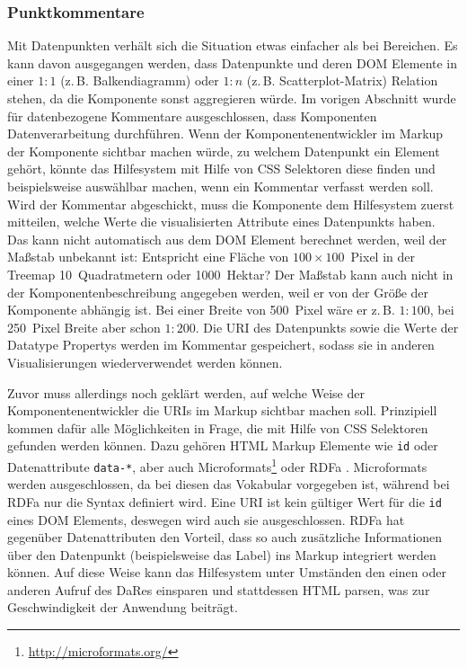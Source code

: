 \documentclass[
	headsepline,
	footsepline,
	fontsize=12pt,
	bibliography=totoc
]{scrbook}
\begin{document}
\subsubsection{Punktkommentare}


Mit Datenpunkten verhält sich die Situation etwas einfacher als bei Bereichen. Es kann davon ausgegangen werden, dass Datenpunkte und deren DOM Elemente in einer $1:1$ (z.\,B. Balkendiagramm) oder $1:n$ (z.\,B. Scatterplot-Matrix) Relation stehen, da die Komponente sonst aggregieren würde. Im vorigen Abschnitt wurde für datenbezogene Kommentare ausgeschlossen, dass Komponenten Datenverarbeitung durchführen. Wenn der Komponentenentwickler im Markup der Komponente sichtbar machen würde, zu welchem Datenpunkt ein Element gehört, könnte das Hilfesystem mit Hilfe von CSS Selektoren diese finden und beispielsweise auswählbar machen, wenn ein Kommentar verfasst werden soll. Wird der Kommentar abgeschickt, muss die Komponente dem Hilfesystem zuerst mitteilen, welche Werte die visualisierten Attribute eines Datenpunkts haben. Das kann nicht automatisch aus dem DOM Element berechnet werden, weil der Maßstab unbekannt ist: Entspricht eine Fläche von $100\times100$~Pixel in der Treemap 10~Quadratmetern oder 1000~Hektar? Der Maßstab kann auch nicht in der Komponentenbeschreibung angegeben werden, weil er von der Größe der Komponente abhängig ist. Bei einer Breite von 500~Pixel wäre er z.\,B. $1:100$, bei 250~Pixel Breite aber schon $1:200$. Die URI des Datenpunkts sowie die Werte der Datatype Propertys werden im Kommentar gespeichert, sodass sie in anderen Visualisierungen wiederverwendet werden können.


Zuvor muss allerdings noch geklärt werden, auf welche Weise der Komponentenentwickler die URIs im Markup sichtbar machen soll. Prinzipiell kommen dafür alle Möglichkeiten in Frage, die mit Hilfe von CSS Selektoren gefunden werden können. Dazu gehören HTML Markup Elemente wie \texttt{id} oder Datenattribute \texttt{data-*}, aber auch Microformats\footnote{\url{http://microformats.org/}} oder RDFa \cite{W3C2012}. Microformats werden ausgeschlossen, da bei diesen das Vokabular vorgegeben ist, während bei RDFa nur die Syntax definiert wird. Eine URI ist kein gültiger Wert für die \texttt{id} eines DOM Elements, deswegen wird auch sie ausgeschlossen. RDFa hat gegenüber Datenattributen den Vorteil, dass so auch zusätzliche Informationen über den Datenpunkt (beispielsweise das Label) ins Markup integriert werden können. Auf diese Weise kann das Hilfesystem unter Umständen den einen oder anderen Aufruf des DaRes einsparen und stattdessen HTML parsen, was zur Geschwindigkeit der Anwendung beiträgt.
\end{document}
